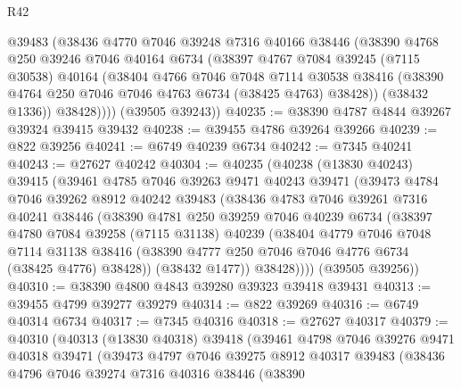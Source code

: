 \begin{lexlean}{R42}
\begin{coremodule}
{          @39483
          (@38436
            @4770
            @7046
            @39248
            @7316
            @40166
            @38446
            (@38390
              @4768
              @250
              @39246
              @7046
              @40164
              @6734
              (@38397
                @4767
                @7084
                @39245
                (@7115 @30538)
                @40164
                (@38404
                  @4766
                  @7046
                  @7048
                  @7114
                  @30538
                  @38416
                  (@38390 @4764 @250 @7046 @7046 @4763 @6734 (@38425 @4763) @38428))
                (@38432 @1336))
              @38428))))
      (@39505 @39243))
@40235 := @38390 @4787 @4844 @39267 @39324 @39415 @39432
@40238 := @39455 @4786 @39264 @39266
@40239 := @822 @39256
@40241 := @6749 @40239 @6734
@40242 := @7345 @40241
@40243 := @27627 @40242
@40304 := @40235
    (@40238
      (@13830 @40243)
      @39415
      (@39461
        @4785
        @7046
        @39263
        @9471
        @40243
        @39471
        (@39473
          @4784
          @7046
          @39262
          @8912
          @40242
          @39483
          (@38436
            @4783
            @7046
            @39261
            @7316
            @40241
            @38446
            (@38390
              @4781
              @250
              @39259
              @7046
              @40239
              @6734
              (@38397
                @4780
                @7084
                @39258
                (@7115 @31138)
                @40239
                (@38404
                  @4779
                  @7046
                  @7048
                  @7114
                  @31138
                  @38416
                  (@38390 @4777 @250 @7046 @7046 @4776 @6734 (@38425 @4776) @38428))
                (@38432 @1477))
              @38428))))
      (@39505 @39256))
@40310 := @38390 @4800 @4843 @39280 @39323 @39418 @39431
@40313 := @39455 @4799 @39277 @39279
@40314 := @822 @39269
@40316 := @6749 @40314 @6734
@40317 := @7345 @40316
@40318 := @27627 @40317
@40379 := @40310
    (@40313
      (@13830 @40318)
      @39418
      (@39461
        @4798
        @7046
        @39276
        @9471
        @40318
        @39471
        (@39473
          @4797
          @7046
          @39275
          @8912
          @40317
          @39483
          (@38436
            @4796
            @7046
            @39274
            @7316
            @40316
            @38446
            (@38390
}
\end{coremodule}
\end{lexlean}
